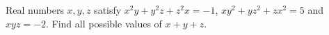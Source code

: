 Real numbers $x,y,z$ satisfy $x^2y+y^2z+z^2x=-1$, $xy^2+yz^2+zx^2=5$ and $xyz=-2$. Find all possible values of $x+y+z$.
